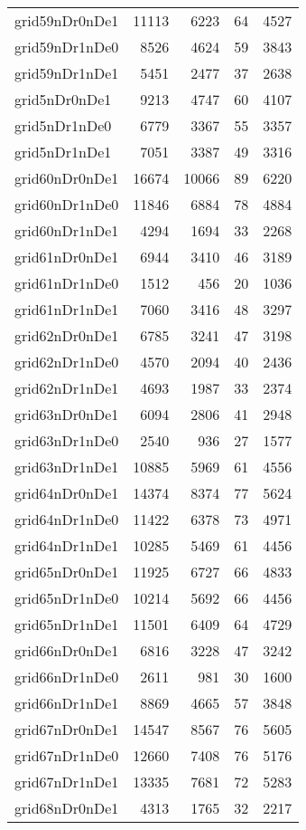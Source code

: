 \begin{longtable}{lrrrr}
grid59nDr0nDe1 & 11113 & 6223 & 64 & 4527 \\
grid59nDr1nDe0 & 8526 & 4624 & 59 & 3843 \\
grid59nDr1nDe1 & 5451 & 2477 & 37 & 2638 \\
grid5nDr0nDe1 & 9213 & 4747 & 60 & 4107 \\
grid5nDr1nDe0 & 6779 & 3367 & 55 & 3357 \\
grid5nDr1nDe1 & 7051 & 3387 & 49 & 3316 \\
grid60nDr0nDe1 & 16674 & 10066 & 89 & 6220 \\
grid60nDr1nDe0 & 11846 & 6884 & 78 & 4884 \\
grid60nDr1nDe1 & 4294 & 1694 & 33 & 2268 \\
grid61nDr0nDe1 & 6944 & 3410 & 46 & 3189 \\
grid61nDr1nDe0 & 1512 & 456 & 20 & 1036 \\
grid61nDr1nDe1 & 7060 & 3416 & 48 & 3297 \\
grid62nDr0nDe1 & 6785 & 3241 & 47 & 3198 \\
grid62nDr1nDe0 & 4570 & 2094 & 40 & 2436 \\
grid62nDr1nDe1 & 4693 & 1987 & 33 & 2374 \\
grid63nDr0nDe1 & 6094 & 2806 & 41 & 2948 \\
grid63nDr1nDe0 & 2540 & 936 & 27 & 1577 \\
grid63nDr1nDe1 & 10885 & 5969 & 61 & 4556 \\
grid64nDr0nDe1 & 14374 & 8374 & 77 & 5624 \\
grid64nDr1nDe0 & 11422 & 6378 & 73 & 4971 \\
grid64nDr1nDe1 & 10285 & 5469 & 61 & 4456 \\
grid65nDr0nDe1 & 11925 & 6727 & 66 & 4833 \\
grid65nDr1nDe0 & 10214 & 5692 & 66 & 4456 \\
grid65nDr1nDe1 & 11501 & 6409 & 64 & 4729 \\
grid66nDr0nDe1 & 6816 & 3228 & 47 & 3242 \\
grid66nDr1nDe0 & 2611 & 981 & 30 & 1600 \\
grid66nDr1nDe1 & 8869 & 4665 & 57 & 3848 \\
grid67nDr0nDe1 & 14547 & 8567 & 76 & 5605 \\
grid67nDr1nDe0 & 12660 & 7408 & 76 & 5176 \\
grid67nDr1nDe1 & 13335 & 7681 & 72 & 5283 \\
grid68nDr0nDe1 & 4313 & 1765 & 32 & 2217 \\

\end{longtable}
